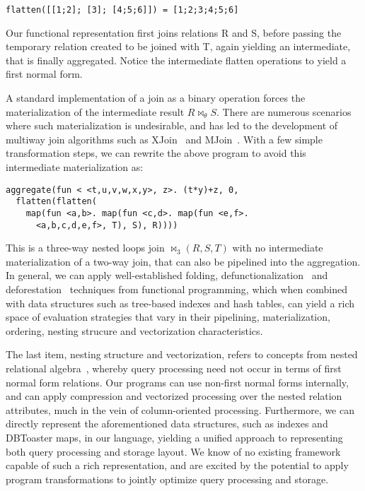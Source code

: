 \vspace{-2mm}
\begin{verbatim}
flatten([[1;2]; [3]; [4;5;6]]) = [1;2;3;4;5;6]
\end{verbatim}

\noindent Our functional representation first joins relations R and S, before
passing the temporary relation created to be joined with T, again yielding an
intermediate, that is finally aggregated. Notice the intermediate flatten
operations to yield a first normal form.

A standard implementation of a join as a binary operation forces the
materialization of the intermediate result $R \bowtie_{\theta} S$. There are
numerous scenarios where such materialization is undesirable, and has led to the
development of multiway join algorithms such as XJoin~\cite{urhan-debull:00} and
MJoin~\cite{viglas-vldb:03}. With a few simple transformation steps, we can
rewrite the above program to avoid this intermediate materialization as:

\begin{verbatim}
aggregate(fun < <t,u,v,w,x,y>, z>. (t*y)+z, 0,
  flatten(flatten(
    map(fun <a,b>. map(fun <c,d>. map(fun <e,f>.
      <a,b,c,d,e,f>, T), S), R))))
\end{verbatim}

This is a three-way nested loops join $\bowtie_3(R,S,T)$ with no intermediate
materialization of a two-way join, that can also be pipelined into the
aggregation. In general, we can apply well-established folding,
defunctionalization~\cite{danvy-ppdp:01} and deforestation~\cite{marlow-fp:92}
techniques from functional programming, which when combined with data structures
such as tree-based indexes and hash tables, can yield a rich space of evaluation
strategies that vary in their pipelining, materialization, ordering, nesting
strucure and vectorization characteristics.

The last item, nesting structure and vectorization, refers to concepts from
nested relational algebra~\cite{schek-infsys:86}, whereby query processing need
not occur in terms of first normal form relations. Our programs can use
non-first normal forms internally, and can apply compression and vectorized
processing over the nested relation attributes, much in the vein of
column-oriented processing. Furthermore, we can directly represent the
aforementioned data structures, such as indexes and DBToaster maps, in our
language, yielding a unified approach to representing both query processing and
storage layout. We know of no existing framework capable of such a rich
representation, and are excited by the potential to apply program
transformations to jointly optimize query processing and storage.


